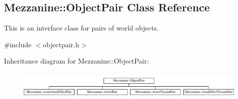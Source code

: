 \hypertarget{classMezzanine_1_1ObjectPair}{
\subsection{Mezzanine::ObjectPair Class Reference}
\label{classMezzanine_1_1ObjectPair}
}


This is an interface class for pairs of world objects.  




{\ttfamily \#include $<$objectpair.h$>$}

Inheritance diagram for Mezzanine::ObjectPair:\begin{figure}[H]
\begin{center}
\leavevmode
\includegraphics[height=1.320755cm]{classMezzanine_1_1ObjectPair}
\end{center}
\end{figure}
